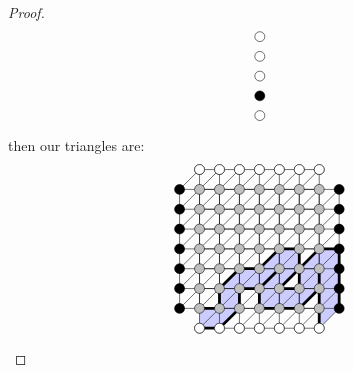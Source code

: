 \begin{proof}
\[\begin{tikzpicture}[scale=.5]
\draw[black,fill=white] (6,2) circle (.25cm);
\draw[black,fill=black] (6,3) circle (.25cm);
\draw[black,fill=white] (6,4) circle (.25cm);
\draw[black,fill=white] (6,5) circle (.25cm);
\draw[black,fill=white] (6,6) circle (.25cm);
\end{tikzpicture}
\]
then our triangles are:
\[
\begin{tikzpicture}[scale=.5]
\fill[blue!20] (6,-1) -- (7,0) -- (6,0) -- cycle;
\fill[blue!20] (6,0) -- (7,0) -- (7,1) -- cycle;
\fill[blue!20] (6,0) -- (7,1) -- (6,1) -- cycle;
\fill[blue!20] (6,1) -- (7,1) -- (7,2) -- cycle;
\fill[blue!20] (6,1) -- (7,2) -- (6,2) -- cycle;
\fill[blue!20] (6,2) -- (7,2) -- (7,3) -- cycle;
\fill[blue!20] (6,2) -- (7,3) -- (6,3) -- cycle;
\fill[blue!20] (5,2) -- (6,2) -- (6,3) -- cycle;
\fill[blue!20] (5,1) -- (6,2) -- (5,2) -- cycle;
\fill[blue!20] (5,1) -- (6,1) -- (6,2) -- cycle;
\fill[blue!20] (5,0) -- (6,1) -- (5,1) -- cycle;
\fill[blue!20] (4,0) -- (5,0) -- (5,1) -- cycle;
\fill[blue!20] (4,0) -- (5,1) -- (4,1) -- cycle;
\fill[blue!20] (3,0) -- (4,0) -- (4,1) -- cycle;
\fill[blue!20] (3,0) -- (4,1) -- (3,1) -- cycle;
\fill[blue!20] (3,1) -- (4,1) -- (4,2) -- cycle;
\fill[blue!20] (4,1) -- (5,2) -- (4,2) -- cycle;
\fill[blue!20] (4,2) -- (5,2) -- (5,3) -- cycle;
\fill[blue!20] (4,2) -- (5,3) -- (4,3) -- cycle;
\fill[blue!20] (3,2) -- (4,2) -- (4,3) -- cycle;
\fill[blue!20] (3,1) -- (4,2) -- (3,2) -- cycle;
\fill[blue!20] (2,1) -- (3,1) -- (3,2) -- cycle;
\fill[blue!20] (2,1) -- (3,2) -- (2,2) -- cycle;
\fill[blue!20] (1,1) -- (2,1) -- (2,2) -- cycle;
\fill[blue!20] (1,0) -- (2,1) -- (1,1) -- cycle;
\fill[blue!20] (1,0) -- (2,0) -- (2,1) -- cycle;
\fill[blue!20] (1,-1) -- (2,0) -- (1,0) -- cycle;
\fill[blue!20] (0,-1) -- (1,-1) -- (1,0) -- cycle;
\fill[blue!20] (0,-1) -- (1,0) -- (0,0) -- cycle;
\draw (-1,0) grid (7,6);
\draw (0,-1) grid (6,7);
\draw[line width=2pt] (6,-1) -- (6,2) -- (6,1) -- (5,0) -- (3,0) -- (3,1) -- (4,2) -- (3,1) -- (2,1) -- (2,0) -- (1,-1) -- (0,-1);
\draw[line width=2pt] (7,0) -- (7,3) -- (6,3) -- (5,2) -- (5,1) -- (4,1) -- (5,2) -- (5,3) -- (4,3) -- (3,2) -- (2,2) -- (1,1) -- (1,0) -- (0,0);
\foreach \i in {-1,...,6}
{
	\foreach \j in {0,...,5}
	{
		\draw (\i,\j) -- ({1+\i},{1+\j});
	}
}
\foreach \i in {0,...,6}
{
\draw ({\i-1},6) -- (\i,7);
\draw (\i,-1) -- ({\i+1},0);
}
\foreach \i in {0,...,6}
{
	\foreach \j in {-1,...,7}
	{
		\draw[black,fill=gray!50] (\i,\j) circle (.25cm);
	}
	\draw[black,fill=white] (\i,-1) circle (.25cm);
	\draw[black,fill=white] (\i,7) circle (.25cm);
	\draw[black,fill=black] (-1,\i) circle (.25cm);
	\draw[black,fill=black] (7,\i) circle (.25cm);
}
\end{tikzpicture}\]
\end{proof}
